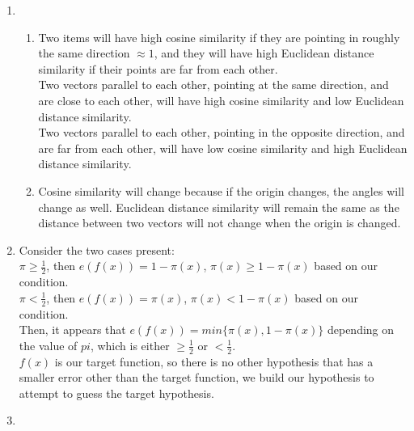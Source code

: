 \documentclass{article}
\begin{document}
    \begin{enumerate}
        \item \begin{enumerate}[label=(\alph*)]
            \item Two items will have high cosine similarity if they are pointing in roughly the same direction $\approx 1$, and they will have high Euclidean distance similarity if their points are far from each other.\\[0.25in]
            Two vectors parallel to each other, pointing at the same direction, and are close to each other, will have high cosine similarity and low Euclidean distance similarity.\\[0.25in]
            Two vectors parallel to each other, pointing in the opposite direction, and are far from each other, will have low cosine similarity and high Euclidean distance similarity.
            \item Cosine similarity will change because if the origin changes, the angles will change as well. Euclidean distance similarity will remain the same as the distance between two vectors will not change when the origin is changed.
        \end{enumerate}

        \item Consider the two cases present:\\
        $\pi \geq \frac{1}{2}$, then $e(f(x)) = 1 - \pi(x)$, $\pi(x) \geq 1 - \pi(x)$ based on our condition.\\
        $\pi < \frac{1}{2}$, then $e(f(x)) = \pi(x)$, $\pi(x) < 1 - \pi(x)$ based on our condition.\\
        Then, it appears that $e(f(x)) = min\{\pi(x), 1 - \pi(x)\}$ depending on the value of $pi$, which is either $\geq \frac{1}{2}$ or $< \frac{1}{2}$.\\[0.25in]
        $f(x)$ is our target function, so there is no other hypothesis that has a smaller error other than the target function, we build our hypothesis to attempt to guess the target hypothesis.

        \item 
    \end{enumerate}
\end{document}
